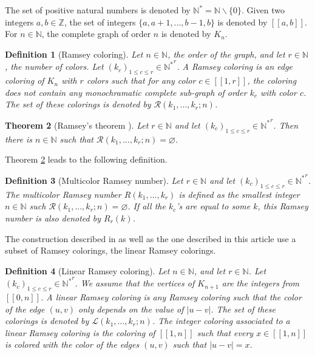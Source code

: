 \documentclass{article}
\newtheorem{definition}{Definition}[section]
\newtheorem{theorem}[definition]{Theorem}
\begin{document}
The set of positive natural numbers is denoted by \(\mathbb{N}^* = \mathbb{N} \backslash \{0\}\). Given two integers 
\(a, b \in \mathbb{Z}\), the set of integers \(\{a, a + 1, ..., b - 1, b\}\) is denoted by \([\![a, b]\!]\). For 
\(n \in \mathbb{N}\),  the complete graph of order \(n\) is denoted by \(K_n\).

\begin{definition}[Ramsey coloring]
Let  \(n \in \mathbb{N}\), the order of the graph, and let \(r \in \mathbb{N}\), the number of colors. Let 
\((k_c)_{1 \leqslant c \leqslant r} \in {\mathbb{N}^*}^r\). A Ramsey coloring is an edge coloring of \(K_n\) with 
\(r\) colors such that for any color \(c \in [\![1, r]\!]\), the coloring does not contain any monochramatic complete 
sub-graph of order \(k_c\) with color \(c\). The set of these colorings is denoted by 
\(\mathcal{R}(k_1, ..., k_r ; n)\).
\end{definition}

\begin{theorem}[Ramsey's theorem \cite{Ramsey}]
\label{thm:ram}
Let \(r \in \mathbb{N}\) and let \((k_c)_{1 \leqslant c \leqslant r} \in {\mathbb{N}^*}^r\). Then there is 
\(n \in \mathbb{N}\) such that \(\mathcal{R}(k_1, ..., k_r ; n) = \varnothing\).
\end{theorem}

Theorem \ref{thm:ram} leads to the following definition.

\begin{definition}[Multicolor Ramsey number]
Let \(r \in \mathbb{N}\) and let \((k_c)_{1 \leqslant c \leqslant r} \in {\mathbb{N}^*}^r\). The multicolor Ramsey  
number \(R(k_1, ..., k_r)\) is defined as the smallest integer \(n \in \mathbb{N}\) such 
\(\mathcal{R}(k_1, ..., k_r ; n) = \varnothing\). If all the \(k_c\)'s are equal to some \(k\), this Ramsey number is 
also denoted by \(R_r(k)\).
\end{definition}

The construction described in \cite{RowleyRamsey} as well as the one described in this article use a subset of Ramsey 
colorings, the linear Ramsey colorings.

\begin{definition}[Linear Ramsey coloring]
Let \(n \in \mathbb{N}\), and let \(r \in \mathbb{N}\). Let \((k_c)_{1 \leqslant c \leqslant r} \in {\mathbb{N}^*}^r\). 
We assume that the vertices of \(K_{n + 1}\) are the integers from \([\![0, n]\!]\). A linear Ramsey coloring is any 
Ramsey coloring such that the color of the edge \((u, v)\) only depends on the value of \(|u - v|\). The set of these 
colorings is denoted by \(\mathcal{L}(k_1, ..., k_r ; n)\). The integer coloring associated to a linear Ramsey coloring 
is the coloring of \([\![1, n]\!]\) such that every \(x \in [\![1, n]\!]\) is colored with the color of the edges \((u, v)\) 
such that \(|u - v| = x\).
\end{definition}
\end{document}
